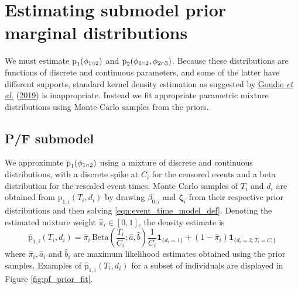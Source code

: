 \documentclass[
  10pt,
  a4paper,
]{article}
\let\Oldcap\cap
\renewcommand{\cap}{\mathrel{\mathsmaller{\Oldcap}}}
\newcommand{\pd}{\text{p}}
\begin{document}
\hypertarget{estimating-submodel-prior-marginal-distributions}{%
\section{Estimating submodel prior marginal
distributions}\label{estimating-submodel-prior-marginal-distributions}}

We must estimate \(\pd_{1}(\phi_{1 \cap 2})\) and
\(\pd_{2}(\phi_{1 \cap 2}, \phi_{2 \cap 3})\). Because these
distributions are functions of discrete and continuous parameters, and
some of the latter have different supports, standard kernel density
estimation as suggested by
\protect\hyperlink{ref-goudie_joining_2019}{Goudie \emph{et al.}}
(\protect\hyperlink{ref-goudie_joining_2019}{2019}) is inappropriate.
Instead we fit appropriate parametric mixture distributions using Monte
Carlo samples from the priors.

\hypertarget{pf-submodel}{%
\subsection{P/F submodel}\label{pf-submodel}}

We approximate \(\pd_{1}(\phi_{1 \cap 2})\) using a mixture of discrete
and continuous distributions, with a discrete spike at \(C_{i}\) for the
censored events and a beta distribution for the rescaled event times.
Monte Carlo samples of \(T_{i}\) and \(d_{i}\) are obtained from
\(\pd_{1, i}(T_{i}, d_{i})\) by drawing \(\beta_{0, i}\) and
\(\boldsymbol{\zeta}_{i}\) from their respective prior distributions and
then solving \eqref{eqn:event_time_model_def}. Denoting the estimated
mixture weight \(\widehat{\pi}_{i} \in [0, 1]\), the density estimate is
\begin{equation}
  \widehat{\pd}_{1, i}(T_{i}, d_{i}) =
    \widehat{\pi}_{i} \, \text{Beta}\left(\frac{T_{i}}{C_{i}}; \widehat{a}, \widehat{b}\right) \frac{1}{C_{i}} \boldsymbol{1}_{\{d_{i} = 1\}} +
    (1 - \widehat{\pi}_{i}) \boldsymbol{1}_{\{d_{i} = 2, T_{i} = C_{i}\}}
  \label{eqn:pf-event-time-prior-dist}
\end{equation} where \(\widehat{\pi}_{i}, \widehat{a}_{i}\) and
\(\widehat{b}_{i}\) are maximum likelihood estimates obtained using the
prior samples. Examples of \(\widehat{\pd}_{1, i}(T_{i}, d_{i})\) for a
subset of individuals are displayed in Figure \ref{fig:pf_prior_fit}.
\end{document}
